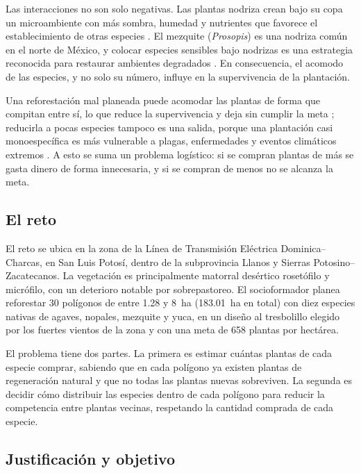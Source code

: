 Las interacciones no son solo negativas. Las plantas nodriza crean bajo su copa un microambiente con más sombra, humedad y nutrientes que favorece el establecimiento de otras especies \autocite{flores2003}. El mezquite (\textit{Prosopis}) es una nodriza común en el norte de México, y colocar especies sensibles bajo nodrizas es una estrategia reconocida para restaurar ambientes degradados \autocite{padilla2006}. En consecuencia, el acomodo de las especies, y no solo su número, influye en la supervivencia de la plantación.

Una reforestación mal planeada puede acomodar las plantas de forma que compitan entre sí, lo que reduce la supervivencia y deja sin cumplir la meta \autocite{conafor2010,holl2011}; reducirla a pocas especies tampoco es una salida, porque una plantación casi monoespecífica es más vulnerable a plagas, enfermedades y eventos climáticos extremos \autocite{liu2018}. A esto se suma un problema logístico: si se compran plantas de más se gasta dinero de forma innecesaria, y si se compran de menos no se alcanza la meta.

\subsection{El reto}
\label{subsec:reto}

El reto se ubica en la zona de la Línea de Transmisión Eléctrica Dominica--Charcas, en San Luis Potosí, dentro de la subprovincia Llanos y Sierras Potosino--Zacatecanos. La vegetación es principalmente matorral desértico rosetófilo y micrófilo, con un deterioro notable por sobrepastoreo. El socioformador planea reforestar 30 polígonos de entre 1.28 y 8~ha (183.01~ha en total) con diez especies nativas de agaves, nopales, mezquite y yuca, en un diseño al tresbolillo elegido por los fuertes vientos de la zona y con una meta de 658 plantas por hectárea.

El problema tiene dos partes. La primera es estimar cuántas plantas de cada especie comprar, sabiendo que en cada polígono ya existen plantas de regeneración natural y que no todas las plantas nuevas sobreviven. La segunda es decidir cómo distribuir las especies dentro de cada polígono para reducir la competencia entre plantas vecinas, respetando la cantidad comprada de cada especie.

\subsection{Justificación y objetivo}
\label{subsec:objetivo}

